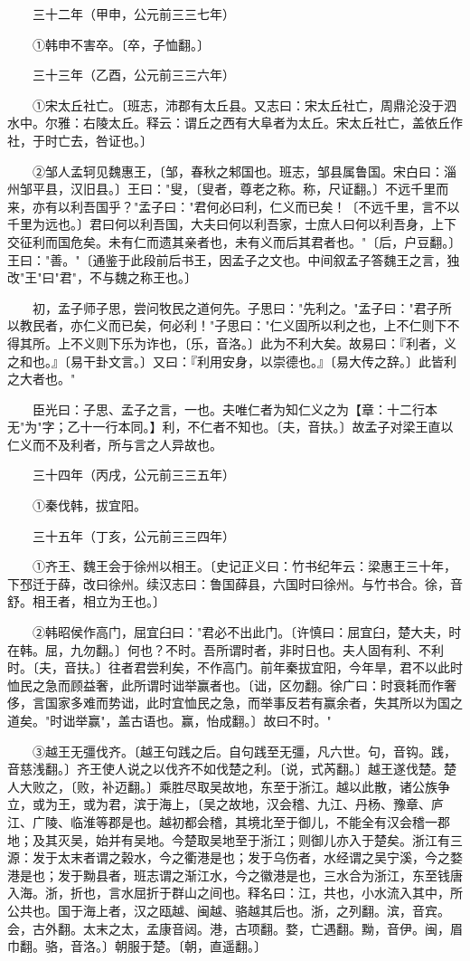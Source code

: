 　　三十二年（甲申，公元前三三七年）

　　①韩申不害卒。〔卒，子恤翻。〕

　　三十三年（乙酉，公元前三三六年）

　　①宋太丘社亡。〔班志，沛郡有太丘县。又志曰：宋太丘社亡，周鼎沦没于泗水中。尔雅：右陵太丘。释云：谓丘之西有大阜者为太丘。宋太丘社亡，盖依丘作社，于时亡去，咎证也。〕

　　②邹人孟轲见魏惠王，〔邹，春秋之邾国也。班志，邹县属鲁国。宋白曰：淄州邹平县，汉旧县。〕王曰："叟，〔叟者，尊老之称。称，尺证翻。〕不远千里而来，亦有以利吾国乎？"孟子曰："君何必曰利，仁义而已矣！〔不远千里，言不以千里为远也。〕君曰何以利吾国，大夫曰何以利吾家，士庶人曰何以利吾身，上下交征利而国危矣。未有仁而遗其亲者也，未有义而后其君者也。"〔后，户豆翻。〕王曰："善。"〔通鉴于此段前后书王，因孟子之文也。中间叙孟子答魏王之言，独改"王"曰"君"，不与魏之称王也。〕

　　初，孟子师子思，尝问牧民之道何先。子思曰："先利之。"孟子曰："君子所以教民者，亦仁义而已矣，何必利！"子思曰："仁义固所以利之也，上不仁则下不得其所。上不义则下乐为诈也，〔乐，音洛。〕此为不利大矣。故易曰：『利者，义之和也。』〔易干卦文言。〕又曰：『利用安身，以崇德也。』〔易大传之辞。〕此皆利之大者也。"

　　臣光曰：子思、孟子之言，一也。夫唯仁者为知仁义之为【章：十二行本无"为"字；乙十一行本同。】利，不仁者不知也。〔夫，音扶。〕故孟子对梁王直以仁义而不及利者，所与言之人异故也。

　　三十四年（丙戌，公元前三三五年）

　　①秦伐韩，拔宜阳。

　　三十五年（丁亥，公元前三三四年）

　　①齐王、魏王会于徐州以相王。〔史记正义曰：竹书纪年云：梁惠王三十年，下邳迁于薛，改曰徐州。续汉志曰：鲁国薛县，六国时曰徐州。与竹书合。徐，音舒。相王者，相立为王也。〕

　　②韩昭侯作高门，屈宜臼曰："君必不出此门。〔许慎曰：屈宜臼，楚大夫，时在韩。屈，九勿翻。〕何也？不时。吾所谓时者，非时日也。夫人固有利、不利时。〔夫，音扶。〕往者君尝利矣，不作高门。前年秦拔宜阳，今年旱，君不以此时恤民之急而顾益奢，此所谓时诎举赢者也。〔诎，区勿翻。徐广曰：时衰耗而作奢侈，言国家多难而势诎，此时宜恤民之急，而举事反若有赢余者，失其所以为国之道矣。"时诎举赢"，盖古语也。赢，怡成翻。〕故曰不时。"

　　③越王无彊伐齐。〔越王句践之后。自句践至无彊，凡六世。句，音钩。践，音慈浅翻。〕齐王使人说之以伐齐不如伐楚之利。〔说，式芮翻。〕越王遂伐楚。楚人大败之，〔败，补迈翻。〕乘胜尽取吴故地，东至于浙江。越以此散，诸公族争立，或为王，或为君，滨于海上，〔吴之故地，汉会稽、九江、丹杨、豫章、庐江、广陵、临淮等郡是也。越初都会稽，其境北至于御儿，不能全有汉会稽一郡地；及其灭吴，始并有吴地。今楚取吴地至于浙江；则御儿亦入于楚矣。浙江有三源：发于太末者谓之榖水，今之衢港是也；发于乌伤者，水经谓之吴宁溪，今之婺港是也；发于黝县者，班志谓之渐江水，今之徽港是也，三水合为浙江，东至钱唐入海。浙，折也，言水屈折于群山之间也。释名曰：江，共也，小水流入其中，所公共也。国于海上者，汉之瓯越、闽越、骆越其后也。浙，之列翻。滨，音宾。会，古外翻。太末之太，孟康音闼。港，古项翻。婺，亡遇翻。黝，音伊。闽，眉巾翻。骆，音洛。〕朝服于楚。〔朝，直遥翻。〕


